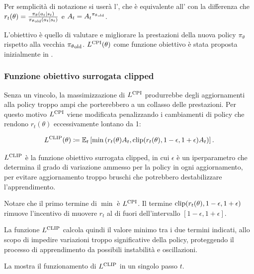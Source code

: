 Per semplicità di notazione si userà l', che è equivalente all' con la differenza che $r_t(\theta) = \frac{\pi_\theta(a_t | s_t)}{{\pi_\theta}_\textnormal{old}(a_t | s_t)}$ e $A_t = {A_t}^{{\pi_\theta}_\textnormal{old}}$.

L'obiettivo è quello di valutare e migliorare la prestazioni della nuova policy $\pi_\theta$ rispetto alla vecchia ${\pi_\theta}_\textnormal{old}$. $L^{\textnormal{CPI}}(\theta)$ come funzione obiettivo è stata proposta inizialmente in \cite{Kakade2002}.

\subsubsection{Funzione obiettivo surrogata clipped}
\label{sec:2_ppo_funzione_obiettivo_clipped}

Senza un vincolo, la massimizzazione di $L^{\textnormal{CPI}}$ produrrebbe degli aggiornamenti alla policy troppo ampi che porterebbero a un collasso delle prestazioni. Per questo motivo $L^{\textnormal{CPI}}$ viene modificata penalizzando i cambiamenti di policy che rendono $r_t(\theta)$ eccessivamente lontano da 1:

\begin{equation}
    L^{\textnormal{CLIP}}(\theta) \coloneqq \mathbb{E}_t \left[ \min \left (r_t(\theta) A_t, \textnormal{clip}(r_t(\theta), 1 - \epsilon, 1 + \epsilon) A_t \right ) \right].
\end{equation}

$L^{\textnormal{CLIP}}$ è la funzione obiettivo surrogata clipped, in cui $\epsilon$ è un iperparametro che determina il grado di variazione ammesso per la policy in ogni aggiornamento, per evitare aggiornamento troppo bruschi che potrebbero destabilizzare l'apprendimento.

Notare che il primo termine di $\min$ è $L^{\textnormal{CPI}}$. Il termine $\textnormal{clip}(r_t(\theta), 1 - \epsilon, 1 + \epsilon)$ rimuove l'incentivo di muovere $r_t$ al di fuori dell'intervallo $[1 - \epsilon, 1 + \epsilon]$.

La funzione $L^{\textnormal{CLIP}}$ calcola quindi il valore minimo tra i due termini indicati, allo scopo di impedire variazioni troppo significative della policy, proteggendo il processo di apprendimento da possibili instabilità e oscillazioni.

La  mostra il funzionamento di $L^{\textnormal{CLIP}}$ in un singolo passo $t$.


